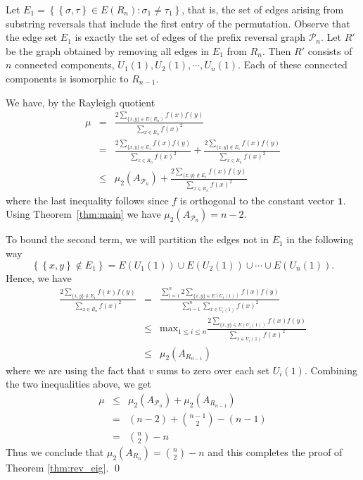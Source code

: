  
 Let $E_1 = \left\{ \left\{\sigma, \tau\right\} \in E(R_n) : \sigma_1 \neq \tau_1 \right\}$,
 that is, the set of edges arising from substring reversals that include 
 the first entry of the permutation.  Observe that the edge set $E_1$
 is exactly the set of edges of the prefix reversal graph $\mathcal{P}_n$.
 Let $R'$ be the graph obtained by removing all edges in $E_1$ from $R_n$.  Then
 $R'$ consists of $n$ connected components, $U_1(1), U_2(1), \cdots, U_n(1)$.
 Each of these connected components is isomorphic to $R_{n-1}$.  
 
 
We have, by the Rayleigh quotient
  \begin{eqnarray*}
   \mu & = &  \frac{2\sum_{\{x,y\} \in E(R_n)} f(x) f(y)}{\sum_{x \in R_n} f(x)^2}\\
   & = & \frac{2\sum_{\{x,y\} \in E_1} f(x) f(y)}{\sum_{x \in R_n} f(x)^2} + \frac{2\sum_{\{x,y\} \not \in E_1} f(x)f(y)}{\sum_{x \in R_n} f(x)^2}\\
   & \leq & \mu_2(A_{\mathcal{P}_n}) + \frac{2\sum_{\{x,y\} \not \in E_1} f(x) f(y)}{\sum_{x \in R_n} f(x)^2}
   \end{eqnarray*}
 where the last inequality follows since $f$ is orthogonal to the constant
 vector $\textbf{1}$.  Using Theorem~\ref{thm:main} we have 
 $\mu_2(A_{\mathcal{P}_n}) = n-2$.
 
 
 To bound the second term, we will partition the edges not in $E_1$ in the following way
  \[ \left\{ \left\{ x,y \right\} \not \in E_1 \right\} = E(U_1(1)) \cup E(U_2(1)) \cup \cdots \cup E(U_n(1)) . \]
 Hence, we have 
  \begin{eqnarray*}
   \frac{2\sum_{\{x,y\} \not \in E_1} f(x) f(y)}{\sum_{x \in R_n} f(x)^2} & = & 
   \frac{\sum_{i=1}^n 2\sum_{\{x,y\} \in E(U_i(1))} f(x) f(y)}{\sum_{i=1}^n \sum_{x \in U_i(1)} f(x)^2} \\
   & \leq & \text{max}_{1 \leq i \leq n}  \frac{2\sum_{\{x,y\} \in E(U_i(1))} f(x) f(y)}{\sum_{x \in U_i(1)} f(x)^2} \\
   & \leq & \mu_2(A_{R_{n-1}}) 
  \end{eqnarray*}
 where we are using the fact that $v$ sums to zero over each set $U_i(1)$.
 Combining the two inequalities above, we get 
  \begin{eqnarray*}
  \mu & \leq & \mu_2(A_{\mathcal{P}_n}) + \mu_2(A_{R_{n-1}}) \\
  & = & (n-2) + \binom{n-1}{2} - (n-1) \\
  & = & \binom{n}{2} - n
  \end{eqnarray*}
  Thus we conclude that $\mu_2(A_{R_n}) = \binom n 2 -n$ and this completes the proof of Theorem \ref{thm:rev_eig}.
\qed



